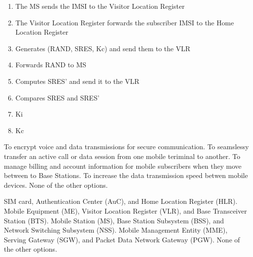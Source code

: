 \begin{solution}
    \begin{enumerate}
        \item The MS sends the IMSI to the Visitor Location Register
        \item The Visitor Location Register forwards the subscriber IMSI to the Home Location Register
        \item Generates (RAND, SRES, Kc) and send them to the VLR
        \item Forwards RAND to MS
        \item Computes SRES' and send it to the VLR
        \item Compares SRES and SRES'
        \item Ki
        \item Kc
    \end{enumerate}
\end{solution}

\begin{checkboxes}
    \choice To encrypt voice and data transmissions for secure communication.
    \choice To seamslessy transfer an active call or data session from one mobile teriminal to another.
    \choice To manage billing and account information for mobile subscribers when they move between to Base Stations.
    \choice To increase the data transmission speed betwen mobile devices.
    \CorrectChoice None of the other options.
\end{checkboxes}

\begin{checkboxes}
    \CorrectChoice SIM card, Authentication Center (AuC), and Home Location Register (HLR).
    \choice Mobile Equipment (ME), Visitor Location Register (VLR), and Base Transceiver Station (BTS).
    \choice Mobile Station (MS), Base Station Subsystem (BSS), and Network Switching Subsystem (NSS).
    \choice Mobile Management Entity (MME), Serving Gateway (SGW), and Packet Data Network Gateway (PGW).
    \choice None of the other options.
\end{checkboxes}

